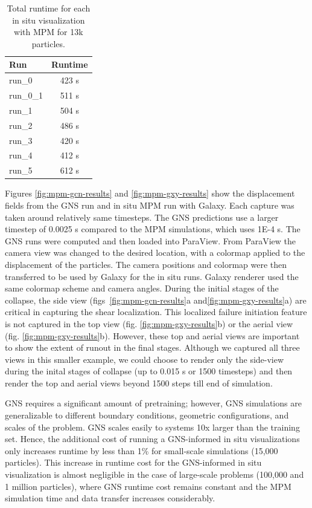 \documentclass{vgtc}
\begin{document}
\begin{table}[h!]
    \centering
    \caption{Total runtime for each in situ visualization with MPM for 13k particles.}
    \label{tab:totalruntimes}
    \begin{tabular}{l c} 
     \toprule
     Run & Runtime \\ 
     \midrule
     run\_0 & 423 s\\ 
     run\_0\_1 & 511 s \\ 
     run\_1 & 504 s\\ 
     run\_2 & 486 s\\ 
     run\_3 & 420 s \\ 
     run\_4 & 412 s \\ 
     run\_5 & 612 s \\ 
     \bottomrule
    \end{tabular}
\end{table}


Figures \ref{fig:mpm-gcn-results} and \ref{fig:mpm-gxy-results} show the displacement fields from the GNS run and in situ MPM run with Galaxy. Each capture was taken around relatively same timesteps. The GNS predictions use a larger timestep of 0.0025 s compared to the MPM simulations, which uses 1E-4 s. The GNS runs were computed and then loaded into ParaView. From ParaView the camera view was changed to the desired location, with a colormap applied to the displacement of the particles. The camera positions and colormap were then transferred to be used by Galaxy for the in situ runs. Galaxy renderer used the same colormap scheme and camera angles. During the initial stages of the collapse, the side view (figs~\ref{fig:mpm-gcn-results}a and\ref{fig:mpm-gxy-results}a) are critical in capturing the shear localization. This localized failure initiation feature is not captured in the top view (fig. \ref{fig:mpm-gxy-results}b) or the aerial view (fig. \ref{fig:mpm-gxy-results}b). However, these top and aerial views are important to show the extent of runout in the final stages. Although we captured all three views in this smaller example, we could choose to render only the side-view during the inital stages of collapse (up to 0.015 s or 1500 timesteps) and then render the top and aerial views beyond 1500 steps till end of simulation. 

GNS requires a significant amount of pretraining; however, GNS simulations are generalizable to different boundary conditions, geometric configurations, and scales of the problem.  GNS scales easily to systems 10x larger than the training set.   Hence, the additional cost of running a GNS-informed in situ visualizations only increases runtime by less than 1\% for small-scale simulations (15,000 particles).  This increase in runtime cost for the GNS-informed in situ visualization is almost negligible in the case of large-scale problems (100,000 and 1 million particles), where GNS runtime cost remains constant and the MPM simulation time and data transfer increases considerably.
\end{document}
